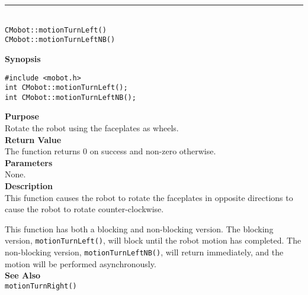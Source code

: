 \noindent
\vspace{5pt}
\rule{4.5in}{0.015in}\\
\noindent
{\LARGE \texttt{CMobot::motionTurnLeft()}}\\
{\LARGE \texttt{CMobot::motionTurnLeftNB()}}\\
{}

\noindent
{\bf Synopsis}
\begin{verbatim}
#include <mobot.h>
int CMobot::motionTurnLeft();
int CMobot::motionTurnLeftNB();
\end{verbatim}

\noindent
{\bf Purpose}\\
Rotate the robot using the faceplates as wheels.\\

\noindent
{\bf Return Value}\\
The function returns 0 on success and non-zero otherwise.\\

\noindent
{\bf Parameters}\\
None.\\

\noindent
{\bf Description}\\
This function causes the robot to rotate the faceplates in opposite directions
to cause the robot to rotate counter-clockwise.

This function has both a blocking and non-blocking version.
The blocking version, \texttt{motionTurnLeft()}, will block until the
robot motion has completed. The non-blocking version, \texttt{motionTurnLeftNB()},
will return immediately, and the motion will be performed asynchronously.\\


\noindent
{\bf See Also}\\
\texttt{motionTurnRight()}

